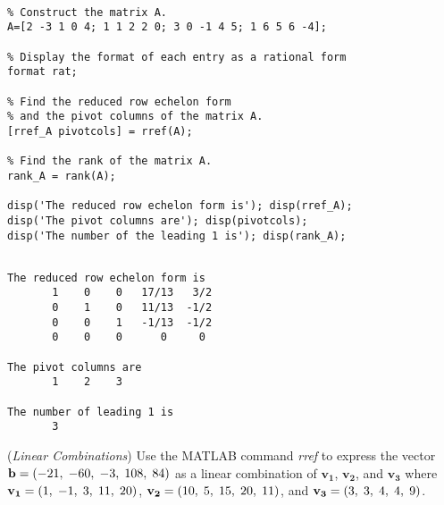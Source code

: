 \begin{sol}

\begin{verbatim}

% Construct the matrix A.
A=[2 -3 1 0 4; 1 1 2 2 0; 3 0 -1 4 5; 1 6 5 6 -4]; 

% Display the format of each entry as a rational form
format rat; 

% Find the reduced row echelon form 
% and the pivot columns of the matrix A.
[rref_A pivotcols] = rref(A);

% Find the rank of the matrix A.
rank_A = rank(A); 

disp('The reduced row echelon form is'); disp(rref_A);
disp('The pivot columns are'); disp(pivotcols);
disp('The number of the leading 1 is'); disp(rank_A);
\end{verbatim}

\begin{outputs}

\begin{verbatim}

The reduced row echelon form is
       1    0    0   17/13   3/2
       0    1    0   11/13  -1/2
       0    0    1   -1/13  -1/2
       0    0    0      0     0

The pivot columns are
       1    2    3

The number of leading 1 is
       3
\end{verbatim}
\end{outputs}
\end{sol}


\vspace{5mm}
\begin{exer}
(\textit{Linear Combinations}) Use the MATLAB command \textit{rref} to express the vector $\mathbf{b}=(-21, \hspace{1mm}-60, \hspace{1mm}-3, \hspace{1mm}108, \hspace{1mm}84)$ as a linear combination of $\mathbf{v_{1}}$, $\mathbf{v_{2}}$, and $\mathbf{v_{3}}$ where 
$\mathbf{v_{1}}=(1, \hspace{1mm} -1, \hspace{1mm}3, \hspace{1mm}11, \hspace{1mm}20)$, 
$\mathbf{v_{2}}=(10, \hspace{1mm}5, \hspace{1mm}15, \hspace{1mm}20, \hspace{1mm}11)$, 
and 
$\mathbf{v_{3}}=(3, \hspace{1mm}3, \hspace{1mm}4, \hspace{1mm}4, \hspace{1mm}9)$.
\end{exer}

